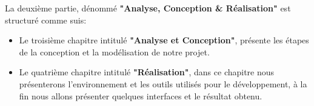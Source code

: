 La deuxième partie, dénommé \textbf{"Analyse, Conception \& Réalisation"} est structuré comme suis:
\begin{itemize}
    \item Le troisième chapitre intitulé \textbf{"Analyse et Conception"}, présente les étapes de la conception et la modélisation de notre projet.
    \item Le quatrième chapitre intitulé \textbf{"Réalisation"}, dans ce chapitre nous présenterons l'environnement et les outils utilisés pour le développement, à la fin nous allons présenter quelques interfaces et le résultat obtenu.
\end{itemize}